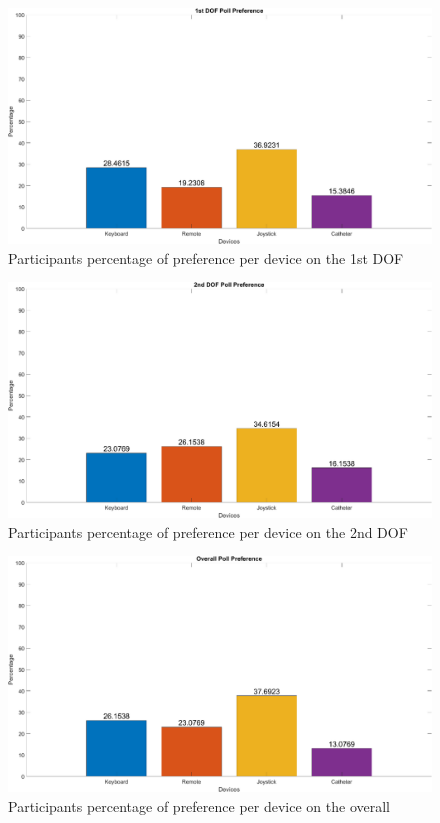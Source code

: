 \begin{figure}[ht]
   \centering
   \includegraphics[width=1.0\textwidth]{img/poll/1stpoll.png}
   \caption{Participants percentage of preference per device on the 1st DOF}
   \label{img:1stpoll}
\end{figure}

\begin{figure}[ht]
   \centering
   \includegraphics[width=1.0\textwidth]{img/poll/2ndpoll.png}
   \caption{Participants percentage of preference per device on the 2nd DOF}
   \label{img:2ndpoll}
\end{figure}

\begin{figure}[ht]
   \centering
   \includegraphics[width=1.0\textwidth]{img/poll/overallpoll.png}
   \caption{Participants percentage of preference per device on the overall}
   \label{img:overallpoll}
\end{figure}

